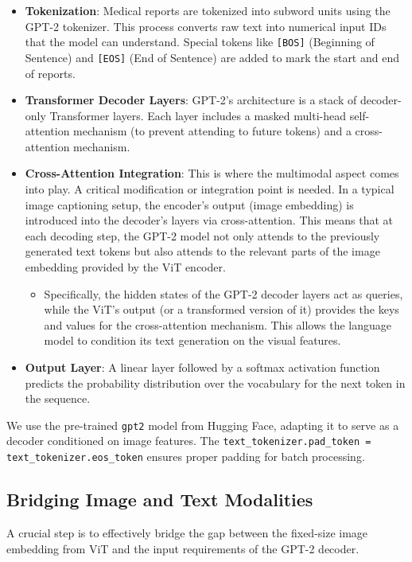 \documentclass[a4paper, 12pt]{article}
\begin{document}
\begin{itemize}
    \item \textbf{Tokenization}: Medical reports are tokenized into subword units using the GPT-2 tokenizer. This process converts raw text into numerical input IDs that the model can understand. Special tokens like \texttt{[BOS]} (Beginning of Sentence) and \texttt{[EOS]} (End of Sentence) are added to mark the start and end of reports.
    \item \textbf{Transformer Decoder Layers}: GPT-2's architecture is a stack of decoder-only Transformer layers. Each layer includes a masked multi-head self-attention mechanism (to prevent attending to future tokens) and a cross-attention mechanism.
    \item \textbf{Cross-Attention Integration}: This is where the multimodal aspect comes into play. A critical modification or integration point is needed. In a typical image captioning setup, the encoder's output (image embedding) is introduced into the decoder's layers via cross-attention. This means that at each decoding step, the GPT-2 model not only attends to the previously generated text tokens but also attends to the relevant parts of the image embedding provided by the ViT encoder.
        \begin{itemize}
            \item Specifically, the hidden states of the GPT-2 decoder layers act as queries, while the ViT's output (or a transformed version of it) provides the keys and values for the cross-attention mechanism. This allows the language model to condition its text generation on the visual features.
        \end{itemize}
    \item \textbf{Output Layer}: A linear layer followed by a softmax activation function predicts the probability distribution over the vocabulary for the next token in the sequence.
\end{itemize}

We use the pre-trained \texttt{gpt2} model from Hugging Face, adapting it to serve as a decoder conditioned on image features. The \texttt{text\_tokenizer.pad\_token = text\_tokenizer.eos\_token} ensures proper padding for batch processing.

\subsection{Bridging Image and Text Modalities}
A crucial step is to effectively bridge the gap between the fixed-size image embedding from ViT and the input requirements of the GPT-2 decoder.
\end{document}

